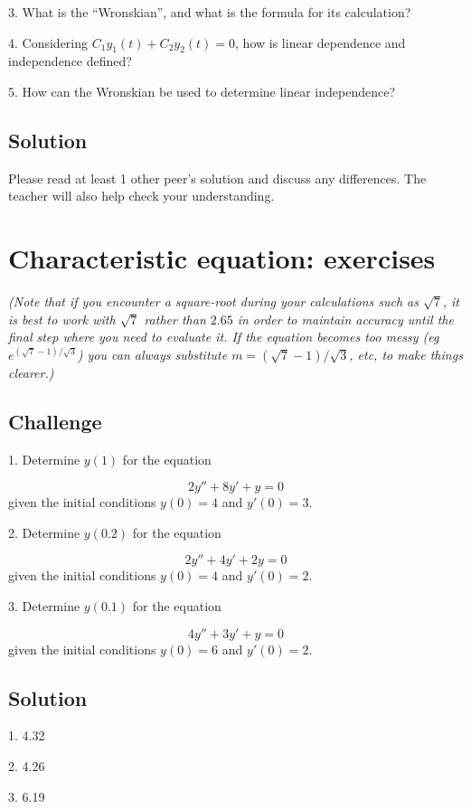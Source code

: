 3. What is the ``Wronskian'', and what is the formula for its calculation?

4. Considering $C_1 y_1(t) + C_2 y_2(t) = 0$, how is linear dependence and independence defined?

5. How can the Wronskian be used to determine linear independence?

\subsection*{Solution}
Please read at least 1 other peer's solution and discuss any differences. The teacher will also help check your understanding.




\newpage
\section{Characteristic equation: exercises}

\emph{(Note that if you encounter a square-root during your calculations such as $\sqrt{7}$, it is best to work with $\sqrt{7}$ rather than $2.65$ in order to maintain accuracy until the final step where you need to evaluate it. If the equation becomes too messy (eg $e^{(\sqrt{7}-1)/\sqrt{3}}$) you can always substitute $m=(\sqrt{7}-1)/\sqrt{3}$, etc, to make things clearer.)}

\subsection*{Challenge}
1. Determine $y(1)$ for the equation

\begin{equation}
    2 y''+8y'+y=0    
\end{equation}
given the initial conditions $y(0)=4$ and $y'(0)=3$.

2. Determine $y(0.2)$ for the equation

\begin{equation}
    2y''+4y'+2y=0
\end{equation}
given the initial conditions $y(0)=4$ and $y'(0)=2$.

3. Determine $y(0.1)$ for the equation

\begin{equation}
    4y''+3y'+y=0
\end{equation}
given the initial conditions $y(0)=6$ and $y'(0)=2$.


\subsection*{Solution}
1. 4.32 %

2. 4.26 %

3. 6.19 %





